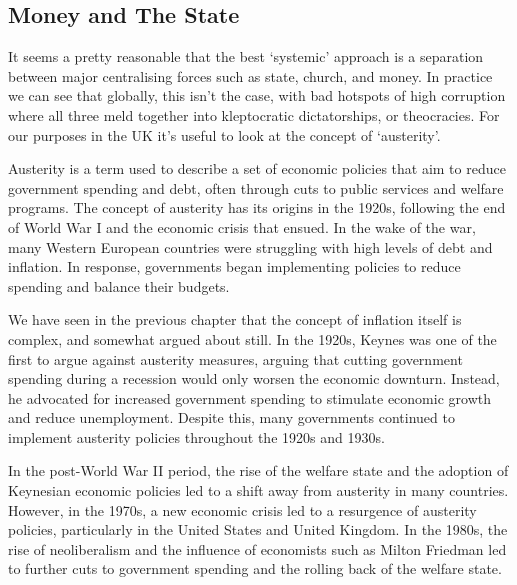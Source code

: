 \subsection{Money and The State}
It seems a pretty reasonable that the best `systemic' approach is a separation between major centralising forces such as state, church, and money. In practice we can see that globally, this isn't the case, with bad hotspots of high corruption where all three meld together into kleptocratic dictatorships, or theocracies. For our purposes in the UK it's useful to look at the concept of `austerity'.\par
Austerity is a term used to describe a set of economic policies that aim to reduce government spending and debt, often through cuts to public services and welfare programs. The concept of austerity has its origins in the 1920s, following the end of World War I and the economic crisis that ensued. In the wake of the war, many Western European countries were struggling with high levels of debt and inflation. In response, governments began implementing policies to reduce spending and balance their budgets.\par
We have seen in the previous chapter that the concept of inflation itself is complex, and somewhat argued about still. In the 1920s, Keynes was one of the first to argue against austerity measures, arguing that cutting government spending during a recession would only worsen the economic downturn. Instead, he advocated for increased government spending to stimulate economic growth and reduce unemployment. Despite this, many governments continued to implement austerity policies throughout the 1920s and 1930s.\par
In the post-World War II period, the rise of the welfare state and the adoption of Keynesian economic policies led to a shift away from austerity in many countries. However, in the 1970s, a new economic crisis led to a resurgence of austerity policies, particularly in the United States and United Kingdom. In the 1980s, the rise of neoliberalism and the influence of economists such as Milton Friedman led to further cuts to government spending and the rolling back of the welfare state.\par 
